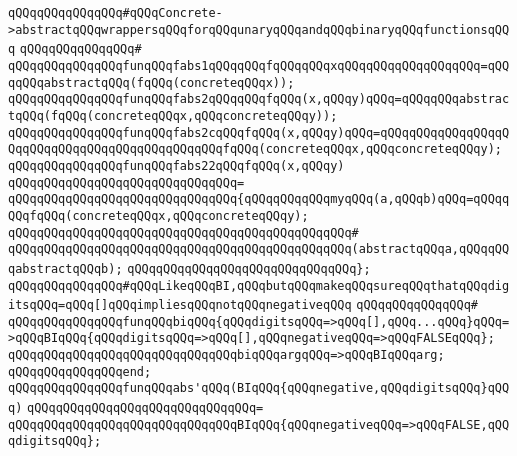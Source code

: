 \newline
\verb|qQQqqQQqqQQqqQQq#qQQqConcrete->abstractqQQqwrappersqQQqforqQQqunaryqQQqandqQQqbinaryqQQqfunctionsqQQq|\newline
\verb|qQQqqQQqqQQqqQQq#|\newline
\verb|qQQqqQQqqQQqqQQqfunqQQqfabs1qQQqqQQqfqQQqqQQqxqQQqqQQqqQQqqQQqqQQq=qQQqqQQqabstractqQQq(fqQQq(concreteqQQqx));|\newline
\verb|qQQqqQQqqQQqqQQqfunqQQqfabs2qQQqqQQqfqQQq(x,qQQqy)qQQq=qQQqqQQqabstractqQQq(fqQQq(concreteqQQqx,qQQqconcreteqQQqy));|\newline
\verb|qQQqqQQqqQQqqQQqfunqQQqfabs2cqQQqfqQQq(x,qQQqy)qQQq=qQQqqQQqqQQqqQQqqQQqqQQqqQQqqQQqqQQqqQQqqQQqqQQqfqQQq(concreteqQQqx,qQQqconcreteqQQqy);|\newline
\newline
\verb|qQQqqQQqqQQqqQQqfunqQQqfabs22qQQqfqQQq(x,qQQqy)|\newline
\verb|qQQqqQQqqQQqqQQqqQQqqQQqqQQqqQQq=|\newline
\verb|qQQqqQQqqQQqqQQqqQQqqQQqqQQqqQQq{qQQqqQQqqQQqmyqQQq(a,qQQqb)qQQq=qQQqqQQqfqQQq(concreteqQQqx,qQQqconcreteqQQqy);|\newline
\verb|qQQqqQQqqQQqqQQqqQQqqQQqqQQqqQQqqQQqqQQqqQQqqQQq#|\newline
\verb|qQQqqQQqqQQqqQQqqQQqqQQqqQQqqQQqqQQqqQQqqQQqqQQq(abstractqQQqa,qQQqqQQqabstractqQQqb);|\newline
\verb|qQQqqQQqqQQqqQQqqQQqqQQqqQQqqQQq};|\newline
\newline
\verb|qQQqqQQqqQQqqQQq#qQQqLikeqQQqBI,qQQqbutqQQqmakeqQQqsureqQQqthatqQQqdigitsqQQq=qQQq[]qQQqimpliesqQQqnotqQQqnegativeqQQq|\newline
\verb|qQQqqQQqqQQqqQQq#|\newline
\verb|qQQqqQQqqQQqqQQqfunqQQqbiqQQq{qQQqdigitsqQQq=>qQQq[],qQQq...qQQq}qQQq=>qQQqBIqQQq{qQQqdigitsqQQq=>qQQq[],qQQqnegativeqQQq=>qQQqFALSEqQQq};|\newline
\verb|qQQqqQQqqQQqqQQqqQQqqQQqqQQqqQQqbiqQQqargqQQq=>qQQqBIqQQqarg;|\newline
\verb|qQQqqQQqqQQqqQQqend;|\newline
\newline
\verb|qQQqqQQqqQQqqQQqfunqQQqabs'qQQq(BIqQQq{qQQqnegative,qQQqdigitsqQQq}qQQq)|\newline
\verb|qQQqqQQqqQQqqQQqqQQqqQQqqQQqqQQq=|\newline
\verb|qQQqqQQqqQQqqQQqqQQqqQQqqQQqqQQqBIqQQq{qQQqnegativeqQQq=>qQQqFALSE,qQQqdigitsqQQq};|\newline
